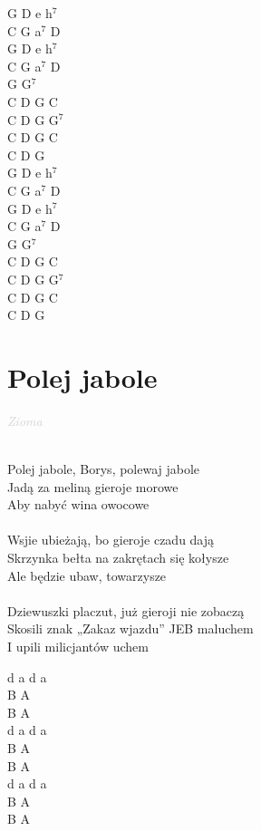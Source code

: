 \documentclass[a5paper, 10pt]{book}
\begin{document}
\begin{minipage}[t]{0.2\textwidth}
  G D e h$^7$\\
  C G a$^7$ D\\
  G D e h$^7$\\
  C G a$^7$ D\\
  G G$^7$\\

  C D G C\\
  C D G G$^7$\\
  C D G C\\
  C D G\\

  G D e h$^7$\\
  C G a$^7$ D\\
  G D e h$^7$\\
  C G a$^7$ D\\
  G G$^7$\\

  C D G C\\
  C D G G$^7$\\
  C D G C\\
  C D G\\
\end{minipage}

\newpage
\section{Polej jabole}\textcolor{lightgray}{\textit{Zioma}}\\~\\
\begin{minipage}[t]{0.8\textwidth}
  Polej jabole, Borys, polewaj jabole\\
  Jadą za meliną gieroje morowe\\
  Aby nabyć wina owocowe\\
  \\
  Wsjie ubieżają, bo gieroje czadu dają\\
  Skrzynka bełta na zakrętach się kołysze\\
  Ale będzie ubaw, towarzysze\\
  \\
  Dziewuszki placzut, już gieroji nie zobaczą\\
  Skosili znak „Zakaz wjazdu” JEB maluchem\\
  I upili milicjantów uchem\\
\end{minipage}
\begin{minipage}[t]{0.2\textwidth}
  d a d a\\
  B A\\
  B A\\

  d a d a\\
  B A\\
  B A\\

  d a d a\\
  B A\\
  B A\\
\end{minipage}
\end{document}
